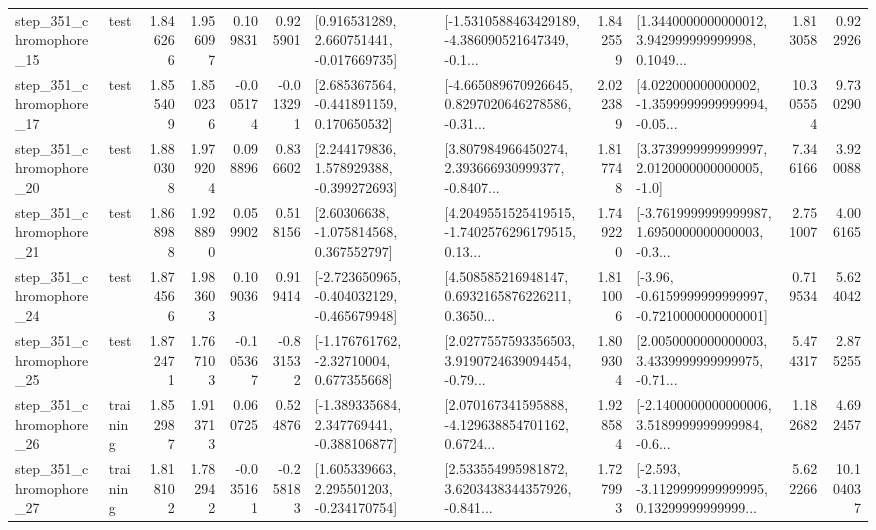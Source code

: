 \begin{tabular}{llrrrrllrlrr}
  step\_351\_chromophore\_15 &      test &      1.846266 &    1.956097 &      0.109831 &  0.925901 &    [0.916531289, 2.660751441, -0.017669735] &  [-1.5310588463429189, -4.386090521647349, -0.1... &       1.842559 &  [1.3440000000000012, 3.942999999999998, 0.1049... &            1.813058 &          0.922926 \\
  step\_351\_chromophore\_17 &      test &      1.855409 &    1.850236 &     -0.005174 & -0.013291 &    [2.685367564, -0.441891159, 0.170650532] &  [-4.665089670926645, 0.8297020646278586, -0.31... &       2.022389 &  [4.022000000000002, -1.3599999999999994, -0.05... &           10.305554 &          9.730290 \\
  step\_351\_chromophore\_20 &      test &      1.880308 &    1.979204 &      0.098896 &  0.836602 &    [2.244179836, 1.578929388, -0.399272693] &  [3.807984966450274, 2.393666930999377, -0.8407... &       1.817748 &     [3.3739999999999997, 2.0120000000000005, -1.0] &            7.346166 &          3.920088 \\
  step\_351\_chromophore\_21 &      test &      1.868988 &    1.928890 &      0.059902 &  0.518156 &     [2.60306638, -1.075814568, 0.367552797] &  [4.2049551525419515, -1.7402576296179515, 0.13... &       1.749220 &  [-3.7619999999999987, 1.6950000000000003, -0.3... &            2.751007 &          4.006165 \\
  step\_351\_chromophore\_24 &      test &      1.874566 &    1.983603 &      0.109036 &  0.919414 &  [-2.723650965, -0.404032129, -0.465679948] &  [4.508585216948147, 0.6932165876226211, 0.3650... &       1.811006 &  [-3.96, -0.6159999999999997, -0.7210000000000001] &            0.719534 &          5.624042 \\
  step\_351\_chromophore\_25 &      test &      1.872471 &    1.767103 &     -0.105367 & -0.831532 &    [-1.176761762, -2.32710004, 0.677355668] &  [2.0277557593356503, 3.9190724639094454, -0.79... &       1.809304 &  [2.0050000000000003, 3.4339999999999975, -0.71... &            5.474317 &          2.875255 \\
  step\_351\_chromophore\_26 &  training &      1.852987 &    1.913713 &      0.060725 &  0.524876 &   [-1.389335684, 2.347769441, -0.388106877] &  [2.070167341595888, -4.129638854701162, 0.6724... &       1.928584 &  [-2.1400000000000006, 3.5189999999999984, -0.6... &            1.182682 &          4.692457 \\
  step\_351\_chromophore\_27 &  training &      1.818102 &    1.782942 &     -0.035161 & -0.258183 &    [1.605339663, 2.295501203, -0.234170754] &  [2.533554995981872, 3.6203438344357926, -0.841... &       1.727993 &  [-2.593, -3.1129999999999995, 0.13299999999999... &            5.622266 &         10.104037 \\

\end{tabular}
